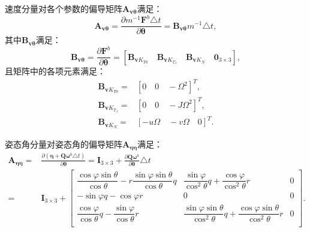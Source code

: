速度分量对各个参数的偏导矩阵$\boldsymbol{A}_{\boldsymbol{v\theta}}$满足：
\begin{equation}
    \boldsymbol{A}_{\boldsymbol{v \theta}} = \frac{\partial m^{-1}\boldsymbol{F}^b \triangle t}{\partial \boldsymbol{\theta}} = \boldsymbol{B}_{\boldsymbol{v\theta}} m^{-1} \triangle t,
\end{equation}
其中$\boldsymbol{B}_{\boldsymbol{v\theta}}$满足：
\begin{equation}
    \boldsymbol{B}_{\boldsymbol{v\theta}} = \frac{\partial \boldsymbol{F}^b }{\partial \boldsymbol{\theta}} = [
        \boldsymbol{B}_{\boldsymbol{v}K_{T0}} \quad
        \boldsymbol{B}_{\boldsymbol{v}K_{T_J}} \quad
        \boldsymbol{B}_{\boldsymbol{v}K_{N}} \quad
        \boldsymbol{0}_{3 \times 3}
        ],
\end{equation}
且矩阵中的各项元素满足：
\begin{equation}
    \begin{aligned}
        \boldsymbol{B}_{\boldsymbol{v}K_{T0}} =& [0 \quad 0 \quad -\Omega^2]^T, \\
        \boldsymbol{B}_{\boldsymbol{v}K_{T_J}} =& [0 \quad 0 \quad -J\Omega^2]^T, \\
        \boldsymbol{B}_{\boldsymbol{v}K_{N}} =& [-u \Omega \quad -v \Omega \quad 0]^T.
    \end{aligned}
\end{equation}

姿态角分量对姿态角的偏导矩阵$\boldsymbol{A_{\eta\eta}}$满足：
\begin{equation}
    \begin{aligned}
        \boldsymbol{A_{\eta\eta}} =& \frac{\partial (\boldsymbol{\eta} + \boldsymbol{Q}\boldsymbol{\omega}^b \triangle t)}{\partial \boldsymbol{\theta}} = \boldsymbol{I}_{3 \times 3} + \frac{\partial \boldsymbol{Q}\boldsymbol{\omega}^b}{\partial \boldsymbol{\theta}}\triangle t \\[6pt]
        =& \boldsymbol{I}_{3 \times 3} + 
        \begin{bmatrix}
            \dfrac{\cos\varphi\sin\theta}{\cos\theta} - r\dfrac{\sin\varphi\sin\theta}{\cos\theta}q & \dfrac{\sin\varphi}{\cos^2\theta}q + \dfrac{\cos\varphi}{\cos^2\theta}r & 0 \\[6pt]
            -\sin\varphi q - \cos\varphi r & 0 & 0 \\[6pt]
            \dfrac{\cos\varphi}{\cos\theta}q - \dfrac{\sin\varphi}{\cos\theta}r & \dfrac{\sin\varphi\sin\theta}{\cos^2\theta}q + \dfrac{\cos\varphi\sin\theta}{\cos^2\theta}r & 0\\[6pt]
        \end{bmatrix}.
    \end{aligned}
\end{equation}

